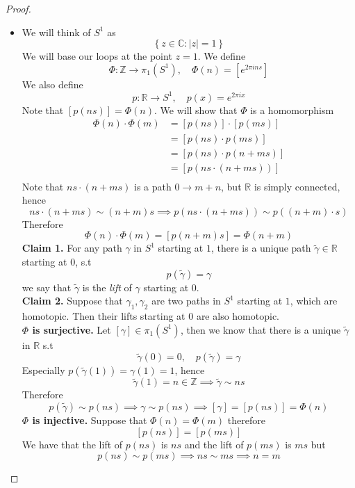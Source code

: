 \documentclass[11pt,a4paper]{article}
\theoremstyle{definition}
\theoremstyle{plain}
\theoremstyle{remark}
\newcommand{\R}{\mathbb{R}}
\newcommand{\Z}{\mathbb{Z}}
\newcommand{\C}{\mathbb{C}}
\renewcommand{\set}[1]{\left\{ #1 \right\}}
\newcommand{\1}{\mathbbm{1}}
\begin{document}
\begin{proof}
\begin{itemize}
        Now we can write a homotopy between $\gamma$ and some loop that skips $N$; see the picture we are using the homotopy above on all $(a,b)$ like above. This is continuous by the gluing 
        lemma according to our homotopy. So $\gamma$ is homotopic to a loop that skips $N$ and so homotopic to the constant loop. 

        \item We will think of $S^1$ as 
        $$\set{z \in \C \colon |z| = 1}$$
        We will base our loops at the point $z = 1$. We define 
        $$\Phi \colon \Z \to \pi_1(S^1), \quad \Phi (n) = [e^{2 \pi i n s}]$$
        We also define 
        $$p \colon \R \to S^1, \quad p(x) = e^{2 \pi i x}$$
        Note that $[p(ns)] = \Phi(n)$. We will show that $\Phi$ is a homomorphism
        \begin{align*}
            \Phi(n) \cdot \Phi(m) &= [p(ns)] \cdot [p(ms)] \\
            &= [p(ns) \cdot p(ms)] \\
            &= [p(ns) \cdot p(n + ms)] \\
            &= [p(ns \cdot (n + ms))] \\
        \end{align*}
        Note that $ns \cdot (n + ms)$ is a path $0 \to m + n$, but $\R$ is simply connected, hence 
        $$ns \cdot (n + ms) \sim (n + m)s \implies p(ns \cdot (n + ms)) \sim p((n+m) \cdot s)$$
        Therefore 
        $$\Phi(n) \cdot \Phi(m) = [p(n+m)s] = \Phi(n+m)$$
        \textbf{Claim 1.} For any path $\gamma$ in $S^1$ starting at $1$, there is a unique path $\tilde{\gamma} \in \R$ starting at $0$, s.t 
        $$p(\tilde{\gamma}) = \gamma$$
        we say that $\tilde{\gamma}$ is the \emph{lift} of $\gamma$ starting at $0$. \\
        \textbf{Claim 2.} Suppose that $\gamma_1, \gamma_2$ are two paths in $S^1$ starting at $1$, which are homotopic. Then their lifts starting at $0$ 
        are also homotopic. \\
        \textbf{$\Phi$ is surjective.} Let $[\gamma] \in \pi_1(S^1)$, then we know that there is a unique $\tilde{\gamma}$ in $\R$ s.t 
        $$\tilde{\gamma} (0) = 0, \quad p(\tilde{\gamma}) = \gamma$$
        Especially $p(\tilde\gamma(1)) = \gamma(1) = 1$, hence 
        $$\tilde \gamma(1) = n \in \Z \implies \tilde \gamma \sim ns$$
        Therefore 
        $$p(\tilde \gamma) \sim p (ns) \implies \gamma \sim p(ns) \implies [\gamma] = [p(ns)] = \Phi(n)$$
        \textbf{$\Phi$ is injective.} Suppose that $\Phi(n) = \Phi(m)$ therefore 
        $$[p(ns)] = [p(ms)]$$
        We have that the lift of $p(ns)$ is $ns$ and the lift of $p(ms)$ is $ms$ but 
        $$p(ns) \sim p(ms) \implies ns \sim ms \implies n = m$$


\end{itemize}
\end{proof}
\end{document}
